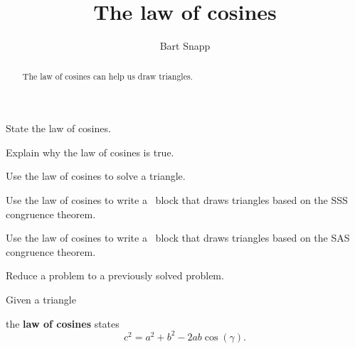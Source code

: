 \documentclass[noauthor,nooutcomes,handout]{ximera}
\title{The law of cosines}
\author{Bart Snapp}
\begin{document}
\begin{abstract}
   The law of cosines can help us draw triangles.
\end{abstract}
\maketitle

\begin{listOutcomes}
\item State the law of cosines.
\item Explain why the law of cosines is true.
\item Use the law of cosines to solve a triangle.
\item Use the law of cosines to write a \snap\ block that draws triangles
  based on the SSS congruence theorem.
\item Use the law of cosines to write a \snap\ block that draws triangles
  based on the SAS congruence theorem.
\item Reduce a problem to a previously solved problem.
\end{listOutcomes}
\mynewpage

Given a triangle
\begin{center}
\end{center}
the \textbf{law of cosines} states
\[
c^2 = a^2 + b^2 - 2ab\cos(\gamma).
\]
  
\end{document}
